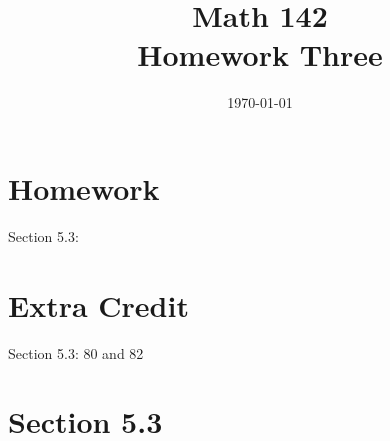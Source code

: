 \documentclass{exam}
\author{}
\date{\today}
\title{Math 142 \\ Homework Three}
\begin{document}
  \maketitle

  \section{Homework}
  Section 5.3: 

  \section{Extra Credit}
  Section 5.3: 80 and 82

  \ifprintanswers
    \section{Section 5.3}
\end{document}
